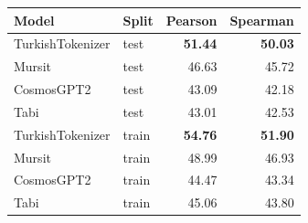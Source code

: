 \begin{tabular}{llrr}
\toprule
\textbf{Model} & \textbf{Split} & \textbf{Pearson} & \textbf{Spearman} \\
\midrule
TurkishTokenizer & test & \textbf{51.44} & \textbf{50.03} \\
Mursit & test & 46.63 & 45.72 \\
CosmosGPT2 & test & 43.09 & 42.18 \\
Tabi & test & 43.01 & 42.53 \\
\midrule
TurkishTokenizer & train & \textbf{54.76} & \textbf{51.90} \\
Mursit & train & 48.99 & 46.93 \\
CosmosGPT2 & train & 44.47 & 43.34 \\
Tabi & train & 45.06 & 43.80 \\
\bottomrule
\end{tabular}
